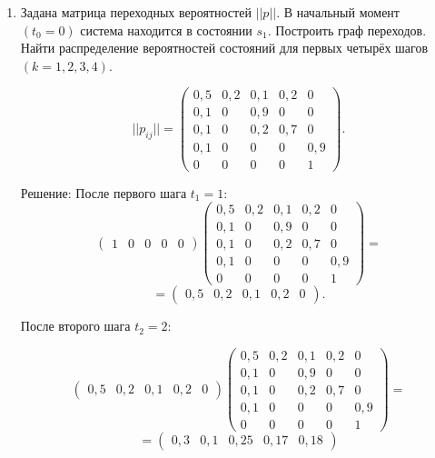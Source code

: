 \documentclass[a4paper, 12pt]{article}
\begin{document}
\begin{enumerate}
{  }
\item{
    Задана матрица переходных вероятностей $||p ||$. В начальный момент $(t_0 = 0)$ система находится в состоянии $s_1$. Построить граф переходов. Найти распределение вероятностей состояний для первых четырёх шагов $(k=1,2,3,4)$.

    $$
    ||p_{ij} || =
    \left (
      \begin{array}{ccccc}
        0,5 & 0,2 & 0,1 & 0,2 & 0 \\
        0,1 & 0 & 0,9 & 0 & 0 \\
        0,1 & 0 & 0,2 & 0,7 & 0 \\
        0,1 & 0 & 0 & 0 & 0,9 \\
        0 & 0 & 0 & 0 & 1
      \end{array}
    \right ).
    $$

    Решение: После первого шага $t_1=1$:
    $$
    \left (
      \begin{array}{ccccc}
        1 & 0 & 0 & 0 & 0
      \end{array}
    \right )
    \left (
      \begin{array}{ccccc}
        0,5 & 0,2 & 0,1 & 0,2 & 0 \\
        0,1 & 0 & 0,9 & 0 & 0 \\
        0,1 & 0 & 0,2 & 0,7 & 0 \\
        0,1 & 0 & 0 & 0 & 0,9 \\
        0 & 0 & 0 & 0 & 1
      \end{array}
    \right )
    =
    $$
    $$
    =
    \left (
      \begin{array}{ccccc}
        0,5 & 0,2 & 0,1 & 0,2 & 0
      \end{array}
    \right ).
    $$

    После второго шага $t_2=2$:

    $$
    \left (
      \begin{array}{ccccc}
        0,5 & 0,2 & 0,1 & 0,2 & 0
      \end{array}
    \right )
    \left (
      \begin{array}{ccccc}
        0,5 & 0,2 & 0,1 & 0,2 & 0 \\
        0,1 & 0 & 0,9 & 0 & 0 \\
        0,1 & 0 & 0,2 & 0,7 & 0 \\
        0,1 & 0 & 0 & 0 & 0,9 \\
        0 & 0 & 0 & 0 & 1
      \end{array}
    \right )
    =
    $$
    $$
    =
    \left (
      \begin{array}{ccccc}
        0,3 & 0,1 & 0,25 & 0,17 & 0,18
      \end{array}
    \right )
    $$

}
\end{enumerate}
\end{document}
